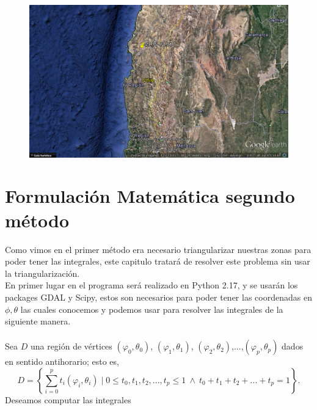 \documentclass[20pt]{report}
\begin{document}
\begin{itemize}
\begin{figure}[H]
{    \includegraphics[scale=1]{chile3.jpg} 
    }
    \centering
\end{figure}
\label{cap.introduccion}\section{Formulaci\'on Matem\'atica segundo m\'etodo}
Como vimos en el primer m\'etodo era necesario triangularizar  nuestras zonas para poder tener las integrales, este capitulo tratar\'a de resolver  este problema sin usar la triangularizaci\'on. \\
En primer lugar en el programa ser\'a realizado en Python 2.17, y se usar\'an los packages GDAL y Scipy, estos son necesarios para poder tener las coordenadas en  $\phi,\theta$ las cuales  conocemos y podemos usar para resolver las integrales de la siguiente manera.
\\
\\

Sea $D$ una regi\'on de v\'ertices $(\varphi_0, \theta_0)$, $(\varphi_1, \theta_1)$, $(\varphi_2, \theta_2)$,...,$(\varphi_p, \theta_p)$ dados en sentido antihorario; esto es,
\begin{equation}\label{T}
D = \left\{ \sum_{i=0}^p t_i (\varphi_i, \theta_i) \mid 0 \leq t_0, t_1, t_2,...,t_p \leq 1 \ \wedge \ t_0+t_1+t_2+...+t_p=1 \right\}.
\end{equation}
Deseamos computar las integrales


\end{itemize}
\end{document}
